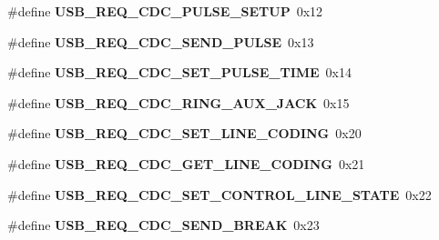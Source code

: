 \begin{DoxyCompactItemize}
\mbox{\label{group__cdc__protocol__group_ga2c303c4a845634355a8f96ac1c965c15}} 
\#define {\bfseries U\+S\+B\+\_\+\+R\+E\+Q\+\_\+\+C\+D\+C\+\_\+\+P\+U\+L\+S\+E\+\_\+\+S\+E\+T\+UP}~0x12
\item 
\mbox{\label{group__cdc__protocol__group_gace1ba968487e94d8accfa1817b56899a}} 
\#define {\bfseries U\+S\+B\+\_\+\+R\+E\+Q\+\_\+\+C\+D\+C\+\_\+\+S\+E\+N\+D\+\_\+\+P\+U\+L\+SE}~0x13
\item 
\mbox{\label{group__cdc__protocol__group_gaa95ef54582b5f30d9b343cd1be5b9051}} 
\#define {\bfseries U\+S\+B\+\_\+\+R\+E\+Q\+\_\+\+C\+D\+C\+\_\+\+S\+E\+T\+\_\+\+P\+U\+L\+S\+E\+\_\+\+T\+I\+ME}~0x14
\item 
\mbox{\label{group__cdc__protocol__group_ga2373fab42c699e4ed789b88a3755255a}} 
\#define {\bfseries U\+S\+B\+\_\+\+R\+E\+Q\+\_\+\+C\+D\+C\+\_\+\+R\+I\+N\+G\+\_\+\+A\+U\+X\+\_\+\+J\+A\+CK}~0x15
\item 
\mbox{\label{group__cdc__protocol__group_ga4e36b0b1795b8fb8d47f0864fbc50120}} 
\#define {\bfseries U\+S\+B\+\_\+\+R\+E\+Q\+\_\+\+C\+D\+C\+\_\+\+S\+E\+T\+\_\+\+L\+I\+N\+E\+\_\+\+C\+O\+D\+I\+NG}~0x20
\item 
\mbox{\label{group__cdc__protocol__group_ga4225199eaffc265eb87f5fd50729428b}} 
\#define {\bfseries U\+S\+B\+\_\+\+R\+E\+Q\+\_\+\+C\+D\+C\+\_\+\+G\+E\+T\+\_\+\+L\+I\+N\+E\+\_\+\+C\+O\+D\+I\+NG}~0x21
\item 
\mbox{\label{group__cdc__protocol__group_ga5095b668106c8843dda529f539e0eed1}} 
\#define {\bfseries U\+S\+B\+\_\+\+R\+E\+Q\+\_\+\+C\+D\+C\+\_\+\+S\+E\+T\+\_\+\+C\+O\+N\+T\+R\+O\+L\+\_\+\+L\+I\+N\+E\+\_\+\+S\+T\+A\+TE}~0x22
\item 
\mbox{\label{group__cdc__protocol__group_ga7cba4467d40cd6532019864a7d068c8d}} 
\#define {\bfseries U\+S\+B\+\_\+\+R\+E\+Q\+\_\+\+C\+D\+C\+\_\+\+S\+E\+N\+D\+\_\+\+B\+R\+E\+AK}~0x23
\item 
\mbox{\label{group__cdc__protocol__group_gaacab4e30847dde3f01d792290ebea666}} 

\end{DoxyCompactItemize}
